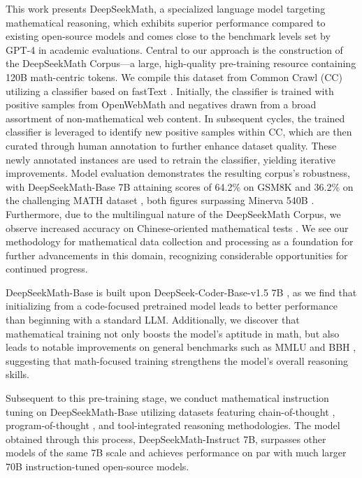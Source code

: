 This work presents DeepSeekMath, a specialized language model targeting mathematical reasoning, which exhibits superior performance compared to existing open-source models and comes close to the benchmark levels set by GPT-4 in academic evaluations. Central to our approach is the construction of the DeepSeekMath Corpus—a large, high-quality pre-training resource containing 120B math-centric tokens. We compile this dataset from Common Crawl (CC) utilizing a classifier based on fastText \citep{joulin2016fasttext}. Initially, the classifier is trained with positive samples from OpenWebMath \citep{openwebmath} and negatives drawn from a broad assortment of non-mathematical web content. In subsequent cycles, the trained classifier is leveraged to identify new positive samples within CC, which are then curated through human annotation to further enhance dataset quality. These newly annotated instances are used to retrain the classifier, yielding iterative improvements. Model evaluation demonstrates the resulting corpus’s robustness, with DeepSeekMath-Base 7B attaining scores of 64.2\% on GSM8K \citep{gsm8k} and 36.2\% on the challenging MATH dataset \citep{MATH}, both figures surpassing Minerva 540B \citep{minerva}. Furthermore, due to the multilingual nature of the DeepSeekMath Corpus, we observe increased accuracy on Chinese-oriented mathematical tests \citep{wei2023cmath,agieval}. We see our methodology for mathematical data collection and processing as a foundation for further advancements in this domain, recognizing considerable opportunities for continued progress.

DeepSeekMath-Base is built upon DeepSeek-Coder-Base-v1.5 7B \citep{deepseek-coder}, as we find that initializing from a code-focused pretrained model leads to better performance than beginning with a standard LLM. Additionally, we discover that mathematical training not only boosts the model’s aptitude in math, but also leads to notable improvements on general benchmarks such as MMLU \citep{mmlu} and BBH \citep{bbh}, suggesting that math-focused training strengthens the model's overall reasoning skills.

Subsequent to this pre-training stage, we conduct mathematical instruction tuning on DeepSeekMath-Base utilizing datasets featuring chain-of-thought \citep{cot}, program-of-thought \citep{pot, pal}, and tool-integrated reasoning \citep{tora} methodologies. The model obtained through this process, DeepSeekMath-Instruct 7B, surpasses other models of the same 7B scale and achieves performance on par with much larger 70B instruction-tuned open-source models.

